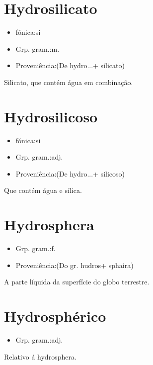 \documentclass{article}
\begin{document}
\section{Hydrosilicato}
\begin{itemize}
\item {fónica:si}
\end{itemize}
\begin{itemize}
\item {Grp. gram.:m.}
\end{itemize}
\begin{itemize}
\item {Proveniência:(De \textunderscore hydro...\textunderscore  + \textunderscore silicato\textunderscore )}
\end{itemize}
Silicato, que contém água em combinação.
\section{Hydrosilicoso}
\begin{itemize}
\item {fónica:si}
\end{itemize}
\begin{itemize}
\item {Grp. gram.:adj.}
\end{itemize}
\begin{itemize}
\item {Proveniência:(De \textunderscore hydro...\textunderscore  + \textunderscore silicoso\textunderscore )}
\end{itemize}
Que contém água e sílica.
\section{Hydrosphera}
\begin{itemize}
\item {Grp. gram.:f.}
\end{itemize}
\begin{itemize}
\item {Proveniência:(Do gr. \textunderscore hudros\textunderscore  + \textunderscore sphaira\textunderscore )}
\end{itemize}
A parte líquida da superfície do globo terrestre.
\section{Hydrosphérico}
\begin{itemize}
\item {Grp. gram.:adj.}
\end{itemize}
Relativo á hydrosphera.
\end{document}
